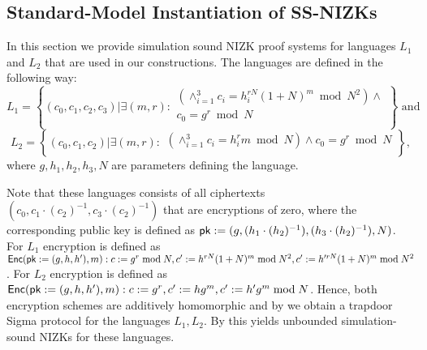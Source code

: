 \subsection{Standard-Model Instantiation of SS-NIZKs}\label{sec:nizk-crs}
In this section we provide simulation sound NIZK proof systems for languages $L_1$ and $L_2$ that are used in our constructions. The languages are defined in the following way:  
\[
L_1 = \left\{(c_0, c_1, c_2, c_3)| \exists (m,r):
\begin{aligned}
       (\land_{i=1}^3 c_i = h_i^{rN}(1+N)^m \bmod N^2) \land \\
       c_0 = g^r \bmod N\\
    \end{aligned}
    \right\} \text{ and } 
\]
\[
L_2 = \left\{(c_0, c_1, c_2)| \exists (m,r):
\begin{aligned}
       (\land_{i=1}^3 c_i = h_i^{r}m \bmod N) \land
       c_0 = g^r \bmod N\\
    \end{aligned}
    \right\},   
\]
where $g, h_1, h_2, h_3, N$ are parameters defining the language. 

Note that these languages consists of all ciphertexts $(c_0, c_1\cdot (c_2)^{-1}, c_3\cdot (c_2)^{-1})$ that are encryptions of zero, where the corresponding public key is defined as $\mathsf{pk}:=(g, (h_1\cdot (h_2)^{-1}), (h_3\cdot (h_2)^{-1}), N)$. For $L_1$ encryption is defined as $\mathsf{Enc}(\mathsf{pk}:=(g,h,h'),m): c:=g^r \bmod N, c':=h^{rN}(1+N)^m \bmod N^2, c':=h'^{rN}(1+N)^m \bmod N^2$. For $L_2$ encryption is defined as $\mathsf{Enc}(\mathsf{pk}:=(g,h,h'),m): c:=g^r, c':=hg^m, c':=h'g^m \bmod N$. Hence, both encryption schemes are additively homomorphic and by  we obtain a trapdoor Sigma protocol for the languages $L_1, L_2$. By  this yields unbounded simulation-sound NIZKs for these languages.








